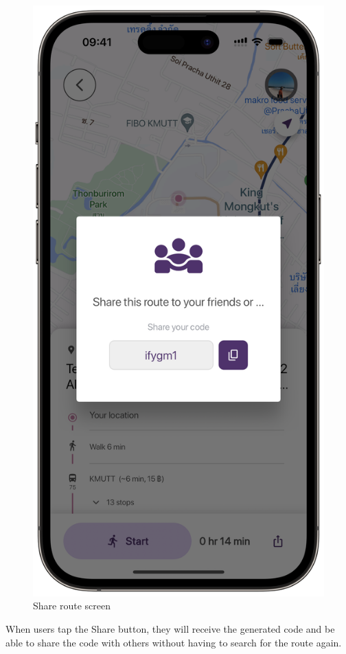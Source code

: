\newpage
\begin{figure}[!h]
	\centering
	\includegraphics[width=0.5\linewidth]{chapter4/share_route_screen.png}
	\caption{Share route screen}
	\label{fig:Share route screen}
\end{figure}
When users tap the Share button, they will receive the generated code and be able to share the code with others without having to search for the route again. 

